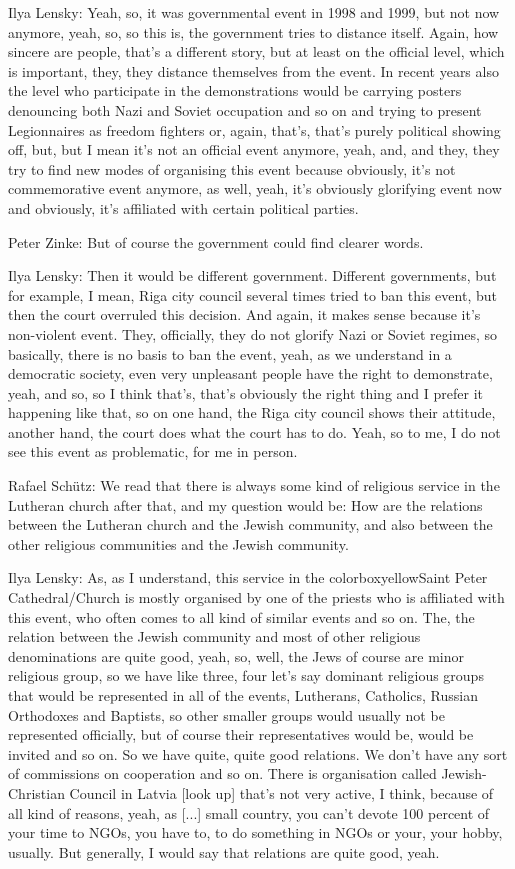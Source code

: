 Ilya Lensky: Yeah, so, it was governmental event in 1998 and 1999, but not now anymore, yeah, so, so this is, the government tries to distance itself. Again, how sincere are people, that’s a different story, but at least on the official level, which is important, they, they distance themselves from the event. In recent years also the level who participate in the demonstrations would be carrying posters denouncing both Nazi and Soviet occupation and so on and trying to present Legionnaires as freedom fighters or, again, that’s, that’s purely political showing off, but, but I mean it’s not an official event anymore, yeah, and, and they, they try to find new modes of organising this event because obviously, it’s not commemorative event anymore, as well, yeah, it’s obviously glorifying event now and obviously, it’s affiliated with certain political parties. 

Peter Zinke: But of course the government could find clearer words. 

Ilya Lensky: Then it would be different government. Different governments, but for example, I mean, Riga city council several times tried to ban this event, but then the court overruled this decision. And again, it makes sense because it’s non-violent event. They, officially, they do not glorify Nazi or Soviet regimes, so basically, there is no basis to ban the event, yeah, as we understand in a democratic society, even very unpleasant people have the right to demonstrate, yeah, and so, so I think that’s, that’s obviously the right thing and I prefer it happening like that, so on one hand, the Riga city council shows their attitude, another hand, the court does what the court has to do. Yeah, so to me, I do not see this event as problematic, for me in person.

Rafael Schütz: We read that there is always some kind of religious service in the Lutheran church after that, and my question would be: How are the relations between the Lutheran church and the Jewish community, and also between the other religious communities and the Jewish community.

Ilya Lensky: As, as I understand, this service in the colorbox{yellow}{Saint Peter Cathedral/Church} is mostly organised by one of the priests who is affiliated with this event, who often comes to all kind of similar events and so on. The, the relation between the Jewish community and most of other religious denominations are quite good, yeah, so, well, the Jews of course are minor religious group, so we have like three, four let’s say dominant religious groups that would be represented in all of the events, Lutherans, Catholics, Russian Orthodoxes and Baptists, so other smaller groups would usually not be represented officially, but of course their representatives would be, would be invited and so on. So we have quite, quite good relations. We don’t have any sort of commissions on cooperation and so on. There is organisation called Jewish-Christian Council in Latvia [look up] that’s not very active, I think, because of all kind of reasons, yeah, as [...] small country, you can’t devote 100 percent of your time to NGOs, you have to, to do something in NGOs or your, your hobby, usually. But generally, I would say that relations are quite good, yeah. 

